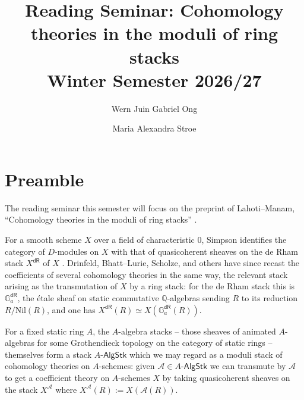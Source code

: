 \documentclass[12pt]{amsart}
\title[Cohomology theories in the moduli of ring stacks]{Reading Seminar: Cohomology theories in the moduli of ring stacks \\[0.5ex] \footnotesize Winter Semester 2026/27}
\author[Ong]{Wern Juin Gabriel Ong}
\author[Stroe]{Maria Alexandra Stroe}
\theoremstyle{definition}
\begin{document}

\maketitle

\section*{Preamble}
The reading seminar this semester will focus on the preprint of Lahoti--Manam, ``Cohomology theories in the moduli of ring stacks'' \cite{LM25}. 

For a smooth scheme $X$ over a field of characteristic $0$, Simpson identifies the category of $D$-modules on $X$ with that of quasicoherent sheaves on the de Rham stack $X^{\mathsf{dR}}$ of $X$ \cite{Sim96}. Drinfeld, Bhatt--Lurie, Scholze, and others have since recast the coefficients of several cohomology theories in the same way, the relevant stack arising as the transmutation of $X$ by a ring stack: for the de Rham stack this is $\mathbb{G}_{a}^{\mathsf{dR}}$, the \'{e}tale sheaf on static commutative $\mathbb{Q}$-algebras sending $R$ to its reduction $R/\mathrm{Nil}(R)$, and one has $X^{\mathsf{dR}}(R) \simeq X(\mathbb{G}_{a}^{\mathsf{dR}}(R))$. 

For a fixed static ring $A$, the $A$-algebra stacks -- those sheaves of animated $A$-algebras for some Grothendieck topology on the category of static rings -- themselves form a stack $A\mathsf{\text{-}AlgStk}$ which we may regard as a moduli stack of cohomology theories on $A$-schemes: given $\mathcal{A}\in A\mathsf{\text{-}AlgStk}$ we can transmute by $\mathcal{A}$ to get a coefficient theory on $A$-schemes $X$ by taking quasicoherent sheaves on the stack $X^{\mathcal{A}}$ where $X^{\mathcal{A}}(R):=X(\mathcal{A}(R))$. 
\end{document}

